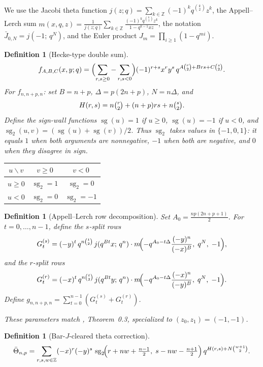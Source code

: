 \documentclass[11pt]{article}
\newtheorem{definition}[theorem]{Definition}
\newcommand{\Z}{\mathbb{Z}}
\newcommand{\sg}{\operatorname{sg}}
\newcommand{\sgtwo}{\operatorname{sg}_2}
\begin{document}
We use the Jacobi theta function
$j(z;q)=\sum_{k\in\Z}(-1)^k q^{\binom{k}{2}}z^k$,
the Appell--Lerch sum
$m(x,q,z)=\frac{1}{j(z;q)}\sum_{k\in\Z}
\frac{(-1)^k q^{\binom{k}{2}}z^k}{1-q^{k-1}xz}$,
the notation $\bar{J}_{0,N}=j(-1;\,q^N)$, and the Euler product
$J_m=\prod_{i\ge 1}(1-q^{mi})$.

\begin{definition}[Hecke-type double sum]
\[
  f_{A,B,C}(x,y;q)
  =\Bigl(\sum_{r,s\ge 0}-\sum_{r,s<0}\Bigr)
    (-1)^{r+s}x^r y^s\,
    q^{A\binom{r}{2}+Brs+C\binom{s}{2}}.
\]
For $f_{n,n+p,n}$: set $B=n+p$,
$\Delta=p(2n+p)$, $N=n\Delta$, and
\[
  H(r,s)=n\tbinom{r}{2}+(n+p)rs+n\tbinom{s}{2}.
\]
Define the sign-wall functions
$\sg(u)=1$ if $u\ge 0$, $\sg(u)=-1$ if $u<0$, and
$\sgtwo(u,v)=(\sg(u)+\sg(v))/2$.  Thus $\sgtwo$ takes values
in $\{-1,0,1\}$: it equals $1$ when both arguments are
nonnegative, $-1$ when both are negative, and $0$ when they
disagree in sign.

\medskip
\begin{center}
\begin{tabular}{c|cc}
$u\backslash v$ & $v\ge 0$ & $v<0$ \\
\hline
$u\ge 0$ & $\sgtwo=1$ & $\sgtwo=0$ \\
$u<0$ & $\sgtwo=0$ & $\sgtwo=-1$
\end{tabular}
\end{center}
\end{definition}

\begin{definition}[Appell--Lerch row decomposition]
Set $A_0=\frac{np(2n+p+1)}{2}$.
For $t=0,\ldots,n-1$, define the $s$-split rows
\[
G_t^{(s)}=(-y)^t\,q^{n\binom{t}{2}}\,
  j(q^{Bt}x;\,q^n)\cdot
  m\!\Bigl(-q^{A_0-t\Delta}\frac{(-y)^n}{(-x)^B},\;q^N,\;-1\Bigr),
\]
and the $r$-split rows
\[
G_t^{(r)}=(-x)^t\,q^{n\binom{t}{2}}\,
  j(q^{Bt}y;\,q^n)\cdot
  m\!\Bigl(-q^{A_0-t\Delta}\frac{(-x)^n}{(-y)^B},\;q^N,\;-1\Bigr).
\]  Define
$g_{n,n+p,n}=\sum_{t=0}^{n-1}(G_t^{(s)}+G_t^{(r)})$.

These parameters match \cite{jHiMo14}, Theorem~0.3,
specialized to $(z_0,z_1)=(-1,-1)$.
\end{definition}

\begin{definition}[Bar-$J$-cleared theta correction]
\[
  \bar\Theta_{n,p}=\sum_{r,s,w\in\Z}
    (-x)^r(-y)^s\,
    \sgtwo\!\Bigl(r+nw+\tfrac{n-1}{2},\;
                   s-nw-\tfrac{n+1}{2}\Bigr)\,
    q^{H(r,s)+N\binom{w+1}{2}}.
\]
\end{definition}
\end{document}
